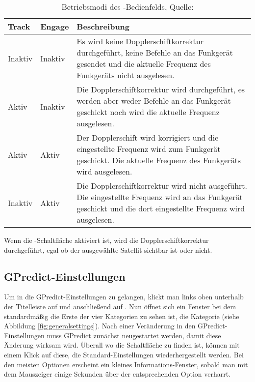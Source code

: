 \begin{table}[h]
	\begin{tabularx}{\textwidth}{|l|l|X|}
		\hline
		\textbf{Track} 	    & \textbf{Engage}	&\textbf{Beschreibung}\\
		\hline
		Inaktiv          	& Inaktiv 			& Es wird keine Dopplerschiftkorrektur durchgeführt, keine Befehle an das Funkgerät gesendet und die aktuelle Frequenz des Funkgeräts nicht ausgelesen.\\
		Aktiv              	& Inaktiv   		& Die Dopplerschiftkorrektur wird durchgeführt, es werden aber weder Befehle an das Funkgerät geschickt noch wird die aktuelle Frequenz ausgelesen.\\
		Aktiv              	& Aktiv	            & Der Dopplerschift wird korrigiert und die eingestellte Frequenz wird zum Funkgerät geschickt. Die aktuelle Frequenz des Funkgeräts wird ausgelesen.\\
		Inaktiv            	& Aktiv   			& Die Dopplerschiftkorrektur wird nicht ausgeführt. Die eingestellte Frequenz wird an das Funkgerät geschickt und die dort eingestellte Frequenz wird ausgelesen.\\
		\hline		
	\end{tabularx}
	\caption{Betriebsmodi des -Bedienfelds, Quelle: \cite{gpredictmanual}}
	\label{tab:radiocontrolmodes}
\end{table}

Wenn die -Schaltfläche aktiviert ist, wird die Dopplerschiftkorrektur durchgeführt, egal ob der ausgewählte Satellit sichtbar ist oder nicht.

\clearpage

\subsection{GPredict-Einstellungen}

Um in die GPredict-Einstellungen zu gelangen, klickt man links oben unterhalb der Titelleiste auf  und anschließend auf . Nun öffnet sich ein Fenster bei dem standardmäßig die Erste der vier Kategorien zu sehen ist, die Kategorie  (siehe Abbildung \ref{fig:generalsettings}). Nach einer Veränderung in den GPredict-Einstellungen muss GPredict zunächst neugestartet werden, damit diese Änderung wirksam wird. Überall wo die Schaltfläche  zu finden ist, können mit einem Klick auf diese, die Standard-Einstellungen wiederhergestellt werden. Bei den meisten Optionen erscheint ein kleines Informations-Fenster, sobald man mit dem Mauszeiger einige Sekunden über der entsprechenden Option verharrt.

